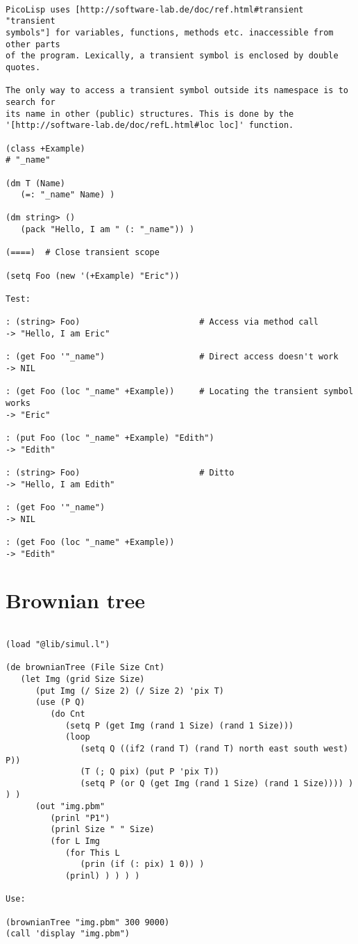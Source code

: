 \begin{verbatim}

PicoLisp uses [http://software-lab.de/doc/ref.html#transient "transient
symbols"] for variables, functions, methods etc. inaccessible from other parts
of the program. Lexically, a transient symbol is enclosed by double quotes.

The only way to access a transient symbol outside its namespace is to search for
its name in other (public) structures. This is done by the
'[http://software-lab.de/doc/refL.html#loc loc]' function.

(class +Example)
# "_name"

(dm T (Name)
   (=: "_name" Name) )

(dm string> ()
   (pack "Hello, I am " (: "_name")) )

(====)  # Close transient scope

(setq Foo (new '(+Example) "Eric"))

Test:

: (string> Foo)                        # Access via method call
-> "Hello, I am Eric"

: (get Foo '"_name")                   # Direct access doesn't work
-> NIL

: (get Foo (loc "_name" +Example))     # Locating the transient symbol works
-> "Eric"

: (put Foo (loc "_name" +Example) "Edith")
-> "Edith"

: (string> Foo)                        # Ditto
-> "Hello, I am Edith"

: (get Foo '"_name")
-> NIL

: (get Foo (loc "_name" +Example))
-> "Edith"

\end{verbatim}

\section*{Brownian tree}

\begin{verbatim}

(load "@lib/simul.l")

(de brownianTree (File Size Cnt)
   (let Img (grid Size Size)
      (put Img (/ Size 2) (/ Size 2) 'pix T)
      (use (P Q)
         (do Cnt
            (setq P (get Img (rand 1 Size) (rand 1 Size)))
            (loop
               (setq Q ((if2 (rand T) (rand T) north east south west) P))
               (T (; Q pix) (put P 'pix T))
               (setq P (or Q (get Img (rand 1 Size) (rand 1 Size)))) ) ) )
      (out "img.pbm"
         (prinl "P1")
         (prinl Size " " Size)
         (for L Img
            (for This L
               (prin (if (: pix) 1 0)) )
            (prinl) ) ) ) )

Use:

(brownianTree "img.pbm" 300 9000)
(call 'display "img.pbm")

\end{verbatim}

